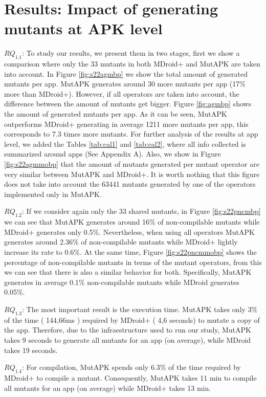 \section{Results: Impact of generating mutants at APK level}

\textbf{\textit{$RQ_{1.1}$}}: To study our results, we present them in two stages, first we show a comparison where only the 33 mutants  in both MDroid+ and MutAPK are taken into account. In Figure \ref{fig:s22agmbp} we show the total amount of generated mutants per app. MutAPK generates around 30 more mutants per app (17\% more than MDroid+). However, if all operators are taken into account, the difference between the amount of mutants get bigger. Figure \ref{fig:agmbp} shows the amount of generated mutants per app. As it can be seen, MutAPK outperforms MDroid+ generating in average 1211 more mutants per app, this corresponds to 7.3 times more mutants. For further analysis of the results at app level, we added the Tables \ref{tab:cal1} and \ref{tab:cal2}, where all info collected is summarized around apps (See Appendix A). Also, we show in Figure \ref{fig:s22agmmobp} that the amount of mutants generated per mutant operator are very similar between MutAPK and MDroid+. It is worth nothing that this figure does not take into account the 63441 mutants generated by one of the operators implemented only in MutAPK. 

\textbf{\textit{$RQ_{1.2}$}}: If we consider again only the 33 shared mutants, in Figure \ref{fig:s22pncmbp} we can see that MutAPK generates around 16\% of non-compilable mutants while MDroid+ generates only 0.5\%. Nevertheless, when using all operators MutAPK generates around 2.36\% of non-compilable mutants while MDroid+ lightly increase its rate to 0.6\%. At the same time, Figure \ref{fig:s22pncmmobp} shows the percentage of non-compilable mutants in terms of the mutant operators, from this we can see that there is also a similar behavior for both. Specifically, MutAPK generates in average 0.1\% non-compilable mutants while MDroid generates 0.05\%.

\textbf{\textit{$RQ_{1.3}$}}: The most important result is the execution time. MutAPK takes only 3\% of the time ( 144,66ms ) required by MDroid+ ( 4,6 seconds) to mutate a copy of the app. Therefore, due to the infraestructure used to run our study, MutAPK takes 9 seconds to generate all mutants for an app (on average), while MDroid takes 19 seconds. 

\textbf{\textit{$RQ_{1.4}$}}: For compilation, MutAPK spends only 6.3\% of the time required by MDroid+ to compile a mutant. Consequently, MutAPK takes 11 min to compile all mutants for an app (on average) while MDroid+ takes 13 min.


